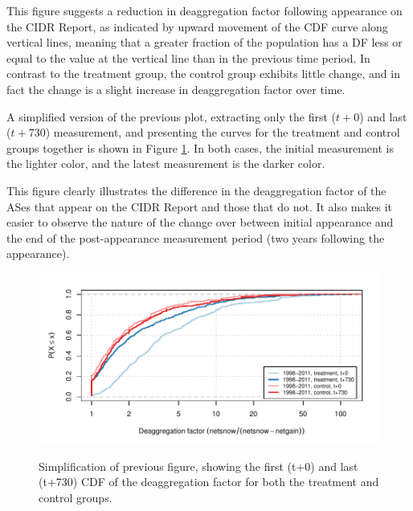 This figure suggests a reduction in deaggregation factor following appearance
on the CIDR Report, as indicated by upward movement of the CDF curve along
vertical lines, meaning that a greater fraction of the population has a DF less
or equal to the value at the vertical line than in the previous time period. In
contrast to the treatment group, the control group exhibits little change, and
in fact the change is a slight increase in deaggregation factor over time.

A simplified version of the previous plot, extracting only the first ($t+0$)
and last ($t+730$) measurement, and presenting the curves for the treatment and
control groups together is shown in Figure \ref{fig:deagg_factor_cdf_simple}.
In both cases, the initial measurement is the lighter color, and the latest
measurement is the darker color. 

This figure clearly illustrates the difference in the deaggregation factor of
the ASes that appear on the CIDR Report and those that do not. It also makes it
easier to observe the nature of the change over between initial appearance and
the end of the post-appearance measurement period (two years following the
appearance).

\begin{figure}[H]
\begin{centering}
\begin{singlespace}
    \includegraphics[width=6in]
        {figures/behavior-deagg_factor-1997_2011-special_tc.pdf}
    \vspace{-2em}\\
    \caption{Simplification of previous figure, showing the first (t+0) and
    last (t+730) CDF of the deaggregation factor for both the treatment and
    control groups.}
    \label{fig:deagg_factor_cdf_simple}
\end{singlespace}
\end{centering}
\end{figure}

